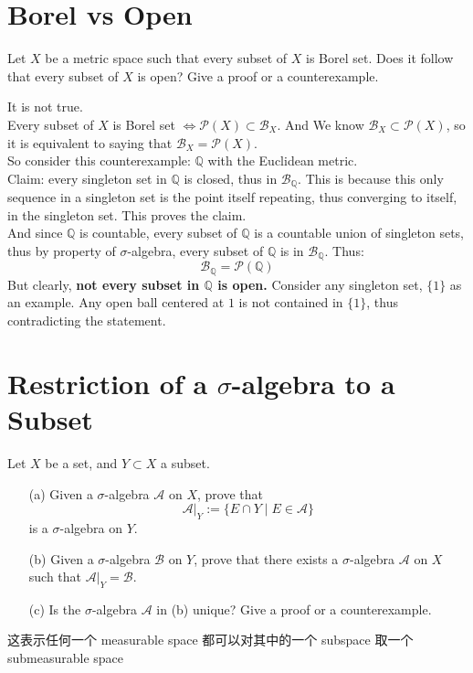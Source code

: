 \documentclass[lang=cn,11pt]{elegantbook}
\begin{document}
\section{Borel vs Open}
Let $X$ be a metric space such that every subset of $X$ is Borel set. Does it follow that every subset of $X$ is open? Give a proof or a counterexample.
\begin{solution}
    It is not true.\\
    Every subset of $X$ is Borel set $\Leftrightarrow \mathcal{P}(X) \subset \mathcal{B}_X$. And We know $\mathcal{B}_X \subset \mathcal{P}(X)$, so it is equivalent to saying that $\mathcal{B}_X = \mathcal{P}(X)$.\\
    So consider this counterexample: $\mathbb{Q}$ with the Euclidean metric.\\
    Claim: every singleton set in $\mathbb{Q}$ is closed, thus in $\mathcal{B}_\mathbb{Q}$.
    This is because this only sequence in a singleton set is the point itself repeating, thus converging to itself, in the singleton set. This proves the claim.\\
    And since $\mathbb{Q}$ is countable, every subset of $\mathbb{Q}$ is a countable union of singleton sets, thus by property of $\sigma$-algebra, every subset of $\mathbb{Q}$ is in $\mathcal{B}_{\mathbb{Q}}$. Thus: $$
    \mathcal{B}_\mathbb{Q} = \mathcal{P}(\mathbb{Q})
    $$
    But clearly, \textbf{not every subset in $\mathbb{Q}$ is open.} Consider any singleton set, $\{1\}$ as an example. Any open ball centered at $1$ is not contained in $\{1\}$, thus contradicting the statement.
    
\end{solution}

\section{Restriction of a $\sigma$-algebra to a Subset}
Let $X$ be a set, and $Y \subset X$ a subset.
\begin{itemize}
    \item[(a)] Given a $\sigma$-algebra $\mathcal{A}$ on $X$, prove that
    \[
    \mathcal{A}|_Y := \{E \cap Y \mid E \in \mathcal{A}\}
    \]
    is a $\sigma$-algebra on $Y$.
    \item[(b)] Given a $\sigma$-algebra $\mathcal{B}$ on $Y$, prove that there exists a $\sigma$-algebra $\mathcal{A}$ on $X$ such that $\mathcal{A}|_Y = \mathcal{B}$.
    \item[(c)] Is the $\sigma$-algebra $\mathcal{A}$ in (b) unique? Give a proof or a counterexample.
\end{itemize}
\begin{remark}
这表示任何一个 measurable space 都可以对其中的一个 subspace 取一个 submeasurable space
\end{remark}
\end{document}
